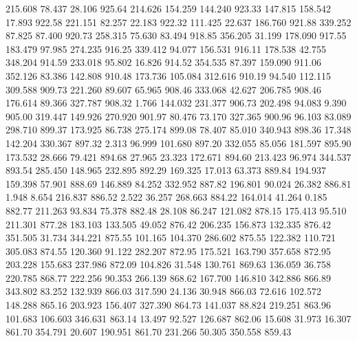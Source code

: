  215.608   78.437   28.106       925.64
 214.626  154.259  144.240       923.33
 147.815  158.542   17.893       922.58
 221.151   82.257   22.183       922.32
 111.425   22.637  186.760       921.88
 339.252   87.825   87.400       920.73
 258.315   75.630   83.494       918.85
 356.205   31.199  178.090       917.55
 183.479   97.985  274.235       916.25
 339.412   94.077  156.531       916.11
 178.538   42.755  348.204       914.59
 233.018   95.802   16.826       914.52
 354.535   87.397  159.090       911.06
 352.126   83.386  142.808       910.48
 173.736  105.084  312.616       910.19
  94.540  112.115  309.588       909.73
 221.260   89.607   65.965       908.46
 333.068   42.627  206.785       908.46
 176.614   89.366  327.787       908.32
   1.766  144.032  231.377       906.73
 202.498   94.083    9.390       905.00
 319.447  149.926  270.920       901.97
  80.476   73.170  327.365       900.96
  96.103   83.089  298.710       899.37
 173.925   86.738  275.174       899.08
  78.407   85.010  340.943       898.36
  17.348  142.204  330.367       897.32
   2.313   96.999  101.680       897.20
 332.055   85.056  181.597       895.90
 173.532   28.666   79.421       894.68
  27.965   23.323  172.671       894.60
 213.423   96.974  344.537       893.54
 285.450  148.965  232.895       892.29
 169.325   17.013   63.373       889.84
 194.937  159.398   57.901       888.69
 146.889   84.252  332.952       887.82
 196.801   90.024   26.382       886.81
   1.948    8.654  216.837       886.52
   2.522   36.257  268.663       884.22
 164.014   41.264    0.185       882.77
 211.263   93.834   75.378       882.48
  28.108   86.247  121.082       878.15
 175.413   95.510  211.301       877.28
 183.103  133.505   49.052       876.42
 206.235  156.873  132.335       876.42
 351.505   31.734  344.221       875.55
 101.165  104.370  286.602       875.55
 122.382  110.721  305.083       874.55
 120.360   91.122  282.207       872.95
 175.521  163.790  357.658       872.95
 203.228  155.683  237.986       872.09
 104.826   31.548  130.761       869.63
 136.059   36.758  220.785       868.77
 222.256   90.353  266.139       868.62
 167.700  146.810  342.886       866.89
 343.802   83.252  132.939       866.03
 317.590   24.136   30.948       866.03
  72.616  102.572  148.288       865.16
 203.923  156.407  327.390       864.73
 141.037   88.824  219.251       863.96
 101.683  106.603  346.631       863.14
  13.497   92.527  126.687       862.06
  15.608   31.973   16.307       861.70
 354.791   20.607  190.951       861.70
 231.266   50.305  350.558       859.43
